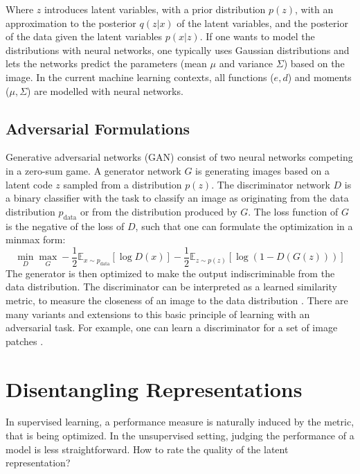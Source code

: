 		Where $z$ introduces latent variables, with a prior distribution $p(z)$, with an approximation to the posterior $q(z|x)$ of the latent variables, and the posterior of the data given the latent variables $p(x|z)$. If one wants to model the distributions with neural networks, one typically uses Gaussian distributions and lets the networks predict the parameters (mean $\mu$ and variance $\Sigma$) based on the image.
		In the current machine learning contexts, all functions ($e, d$) and moments ($\mu, \Sigma$) are modelled with neural networks.

	\subsection{Adversarial Formulations}\label{sec:adversarial}
		{Generative adversarial networks} (GAN) \cite{goodfellow14gan} consist of two neural networks competing in a zero-sum game. A generator network $G$ is generating images based on a latent code $z$ sampled from a distribution $p(z)$. The discriminator network $D$ is a binary classifier with the task to classify an image as originating from the data distribution $p_{\mathrm{data}}$ or from the distribution produced by $G$. The loss function of $G$ is the negative of the loss of $D$, such that one can formulate the optimization in a minmax form:
		\begin{equation}
			\min_D \max_G - \frac{1}{2} \mathds{E}_{x \sim p_{\mathrm{data}}} [\log D(x)] - \frac{1}{2} \mathds{E}_{z\sim p(z)}[\log (1-D(G(z)))]
		\end{equation}
		The generator is then optimized to make the output indiscriminable from the data distribution.
		The discriminator can be interpreted as a learned similarity metric, to measure the closeness of an image to the data distribution \cite{larsen15vaegan}.
		There are many variants and extensions to this basic principle of learning with an adversarial task. For example, one can learn a discriminator for a set of image patches \cite{isola17image2image}. 

\section{Disentangling Representations}\label{sec:disentangled}
	In supervised learning, a performance measure is naturally induced by the metric, that is being optimized. In the unsupervised setting, judging the performance of a model is less straightforward.
	How to rate the quality of the latent representation?

